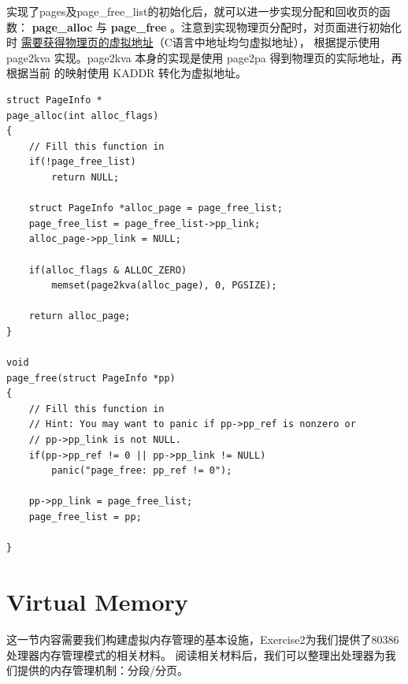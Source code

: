 \documentclass[12pt, letterpaper]{report}
\begin{document}
实现了pages及page\_free\_list的初始化后，就可以进一步实现分配和回收页的函数：
\textbf{page\_alloc} 与 \textbf{page\_free} 。注意到实现物理页分配时，对页面进行初始化时
\underline{需要获得物理页的虚拟地址}（C语言中地址均匀虚拟地址），
根据提示使用 page2kva 实现。page2kva 本身的实现是使用 page2pa 得到物理页的实际地址，再根据当前
的映射使用 KADDR 转化为虚拟地址。
\lstset{style=CStyle}
\setmainfont{Consolas}
\begin{lstlisting}
struct PageInfo *
page_alloc(int alloc_flags)
{
    // Fill this function in
    if(!page_free_list)
        return NULL;

    struct PageInfo *alloc_page = page_free_list;
    page_free_list = page_free_list->pp_link;
    alloc_page->pp_link = NULL;

    if(alloc_flags & ALLOC_ZERO)
        memset(page2kva(alloc_page), 0, PGSIZE);

    return alloc_page;
}

void
page_free(struct PageInfo *pp)
{
	// Fill this function in
	// Hint: You may want to panic if pp->pp_ref is nonzero or
	// pp->pp_link is not NULL.
	if(pp->pp_ref != 0 || pp->pp_link != NULL)
		panic("page_free: pp_ref != 0");
	
	pp->pp_link = page_free_list;
	page_free_list = pp;

}
\end{lstlisting}
\setmainfont{Times New Roman}


\chapter[\Large Virtual Memory]{Virtual Memory}

\quad \par 
这一节内容需要我们构建虚拟内存管理的基本设施，Exercise2为我们提供了80386处理器内存管理模式的相关材料。
阅读相关材料后，我们可以整理出处理器为我们提供的内存管理机制：分段/分页。
\end{document}
